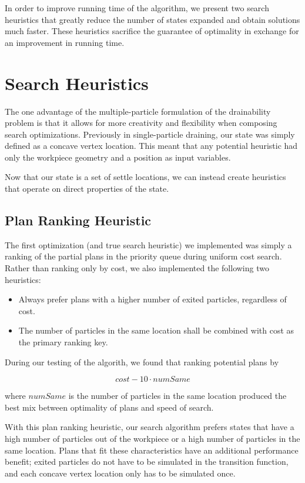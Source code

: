 In order to improve running time of the algorithm, we present two search heuristics that greatly reduce the number of states expanded and obtain solutions much faster. These heuristics sacrifice the guarantee of optimality in exchange for an improvement in running time.

\section{Search Heuristics}

The one advantage of the multiple-particle formulation of the drainability problem is that it allows for more creativity and flexibility when composing search optimizations. Previously in single-particle draining, our state was simply defined as a concave vertex location. This meant that any potential heuristic had only the workpiece geometry and a position as input variables.

Now that our state is a set of settle locations, we can instead create heuristics that operate on direct properties of the state.

\subsection{Plan Ranking Heuristic}

The first optimization (and true search heuristic) we implemented was simply a ranking of the partial plans in the priority queue during uniform cost search. Rather than ranking only by cost, we also implemented the following two heuristics:

\begin{itemize}
\item Always prefer plans with a higher number of exited particles, regardless of cost.
\item The number of particles in the same location shall be combined with cost as the primary ranking key.
\end{itemize}

During our testing of the algorith, we found that ranking potential plans by

$$
cost - 10 \cdot numSame
$$

where $numSame$ is the number of particles in the same location produced the best mix between optimality of plans and speed of search.

With this plan ranking heuristic, our search algorithm prefers states that have a high number of particles out of the workpiece or a high number of particles in the same location. Plans that fit these characteristics have an additional performance benefit; exited particles do not have to be simulated in the transition function, and each concave vertex location only has to be simulated once.

